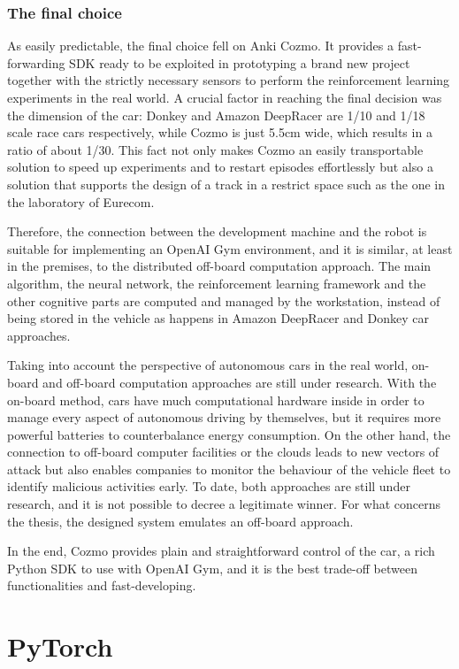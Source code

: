 \subsubsection{The final choice}

As easily predictable, the final choice fell on Anki Cozmo.
It provides a fast-forwarding SDK ready to be exploited in prototyping a brand new project together with the strictly necessary sensors to perform the reinforcement learning experiments in the real world.
A crucial factor in reaching the final decision was the dimension of the car: Donkey and Amazon DeepRacer are 1/10 and 1/18 scale race cars respectively, while Cozmo is just 5.5cm wide, which results in a ratio of about 1/30.
This fact not only makes Cozmo an easily transportable solution to speed up experiments and to restart episodes effortlessly but also a solution that supports the design of a track in a restrict space such as the one in the laboratory of Eurecom.

Therefore, the connection between the development machine and the robot is suitable for implementing an OpenAI Gym environment, and it is similar, at least in the premises, to the distributed off-board computation approach.
The main algorithm, the neural network, the reinforcement learning framework and the other cognitive parts are computed and managed by the workstation, instead of being stored in the vehicle as happens in Amazon DeepRacer and Donkey car approaches.

Taking into account the perspective of autonomous cars in the real world, on-board and off-board computation approaches are still under research.
With the on-board method, cars have much computational hardware inside in order to manage every aspect of autonomous driving by themselves, but it requires more powerful batteries to counterbalance energy consumption.
On the other hand, the connection to off-board computer facilities or the clouds leads to new vectors of attack but also enables companies to monitor the behaviour of the vehicle fleet to identify malicious activities early.
To date, both approaches are still under research, and it is not possible to decree a legitimate winner.
For what concerns the thesis, the designed system emulates an off-board approach.

In the end, Cozmo provides plain and straightforward control of the car, a rich Python SDK to use with OpenAI Gym, and it is the best trade-off between functionalities and fast-developing.

\section{PyTorch}

